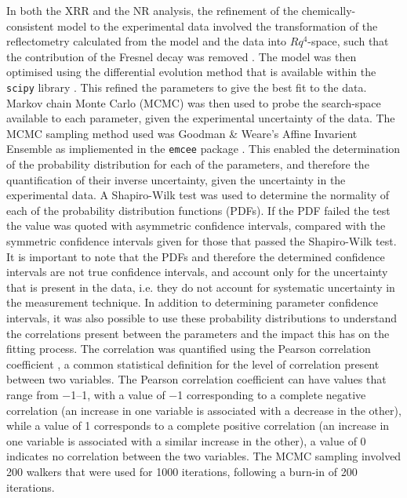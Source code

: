 In both the XRR and the NR analysis, the refinement of the chemically-consistent model to the experimental data involved the transformation of the reflectometry calculated from the model and the data into $Rq^4$-space, such that the contribution of the Fresnel decay was removed \cite{gerelli_aurore_2016}.
The model was then optimised using the differential evolution method that is available within the \texttt{scipy} library \cite{jones_scipy_2001}.
This refined the parameters to give the best fit to the data.
Markov chain Monte Carlo (MCMC) was then used to probe the search-space available to each parameter, given the experimental uncertainty of the data.
The MCMC sampling method used was Goodman \& Weare's Affine Invarient Ensemble \cite{goodman_ensemble_2010} as impliemented in the \texttt{emcee} package \cite{foreman-mackey_emcee_2013}.
This enabled the determination of the probability distribution for each of the parameters, and therefore the quantification of their inverse uncertainty, given the uncertainty in the experimental data.
A Shapiro-Wilk test \cite{shapiro_analysis_1965} was used to determine the normality of each of the probability distribution functions (PDFs).
If the PDF failed the test the value was quoted with asymmetric confidence intervals, compared with the symmetric confidence intervals given for those that passed the Shapiro-Wilk test.
It is important to note that the PDFs and therefore the determined confidence intervals are not true confidence intervals, and account only for the uncertainty that is present in the data, i.e. they do not account for systematic uncertainty in the measurement technique.
In addition to determining parameter confidence intervals, it was also possible to use these probability distributions to understand the correlations present between the parameters and the impact this has on the fitting process.
The correlation was quantified using the Pearson correlation coefficient \cite{pearson_notes_1895}, a common statistical definition for the level of correlation present between two variables.
The Pearson correlation coefficient can have values that range from \numrange{-1}{1}, with a value of \num{-1} corresponding to a complete negative correlation (an increase in one variable is associated with a decrease in the other), while a value of \num{1} corresponds to a complete positive correlation (an increase in one variable is associated with a similar increase in the other), a value of \num{0} indicates no correlation between the two variables.
The MCMC sampling involved 200 walkers that were used for 1000 iterations, following a burn-in of 200 iterations.
